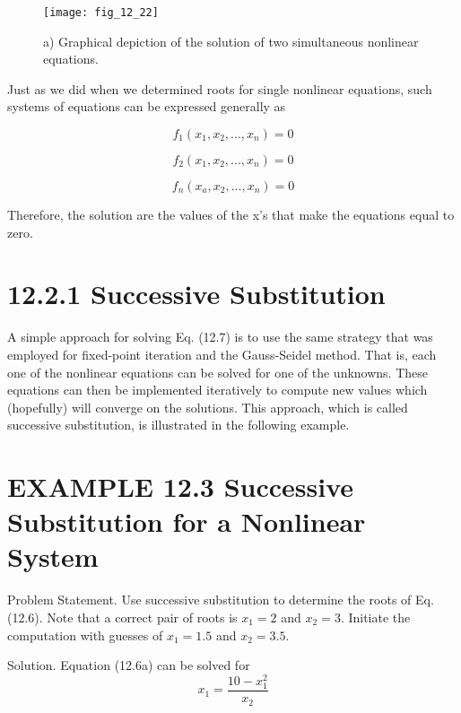 \documentclass[../main.tex]{subfiles}
\begin{document}
\begin{figure}[H]
		\centering
		\texttt{[image: fig\_12\_22]}
	   \caption{\textsf{a) Graphical depiction of the solution of two simultaneous nonlinear equations.}}
	   \label{fig:fig_12_22}
\end{figure}

Just as we did when we determined roots for single nonlinear equations, such systems
of equations can be expressed generally as

\begin{equation}
f_{1}(x_{1},x_{2},...,x_{n})=0
\end{equation}

\begin{equation}
f_{2}(x_{1},x_{2},...,x_{n})=0
\tag{12.7}
\end{equation}

\begin{equation}
f_{n}(x_{a},x_{2},...,x_{n})=0
\end{equation}

Therefore, the solution are the values of the x's that make the equations equal to zero.

\section*{12.2.1 Successive Substitution}

A simple approach for solving Eq. (12.7) is to use the same strategy that was employed for
fixed-point iteration and the Gauss-Seidel method. That is, each one of the nonlinear equations can be solved for one of the unknowns. These equations can then be implemented
iteratively to compute new values which (hopefully) will converge on the solutions. This
approach, which is called successive substitution, is illustrated in the following example.

\section*{EXAMPLE 12.3 Successive Substitution for a Nonlinear System}

Problem Statement. Use successive substitution to determine the roots of Eq. (12.6).
Note that a correct pair of roots is $x_{1}=2$ and $x_{2}=3$. Initiate the computation with guesses
of $x_{1}=1.5$ and $x_{2}=3.5$.

Solution. Equation (12.6a) can be solved for
\begin{equation}
x_{1}=\frac{10-x^{2}_{1}}{x_{2}}
\tag{E12.2.1}
\end{equation}
\end{document}
